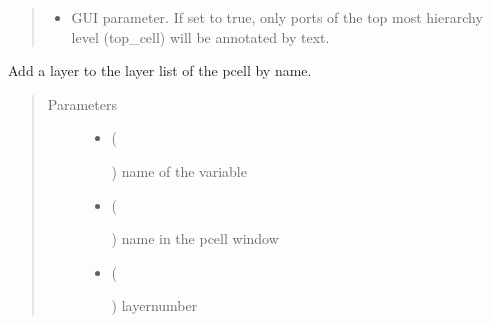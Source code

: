 \documentclass[a4paper,10pt,english]{sphinxmanual}
\begin{document}
\begin{fulllineitems}
\begin{quote}
\begin{description}
\begin{itemize}
\item {} 
 \textendash{} GUI parameter. If set to true, only ports of the top most hierarchy level (top\_cell) will be
annotated by text.

\end{itemize}

\end{description}\end{quote}

\begin{fulllineitems}
\label{\detokenize{photonics:photonics.PhotDevice.add_layer}}
Add a layer to the layer list of the pcell by name.
\begin{quote}\begin{description}
\item[{Parameters}] \leavevmode\begin{itemize}
\item {} 
 (%
\begin{footnote}[28]\sphinxAtStartFootnote
{}
%
\end{footnote}) \textendash{} name of the variable

\item {} 
 (%
\begin{footnote}[29]\sphinxAtStartFootnote
{}
%
\end{footnote}) \textendash{} name in the pcell window

\item {} 
 (%
\begin{footnote}[30]\sphinxAtStartFootnote
{}
%
\end{footnote}) \textendash{} layernumber


\end{itemize}
\end{description}
\end{quote}
\end{fulllineitems}
\end{fulllineitems}
\end{document}

